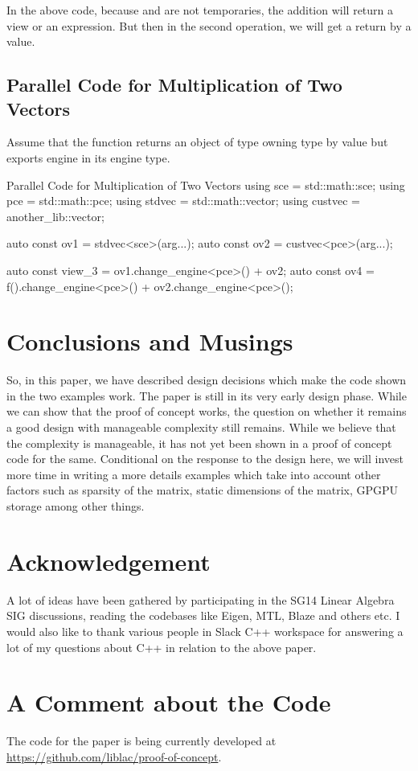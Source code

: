 \documentclass[oneside,11pt,a4paper]{jbarticle}
\begin{document}
In the above code, because  and  are not
temporaries, the addition will return a view or an expression. But then in the
second operation, we will get a return by a value.

\subsection{Parallel Code for Multiplication of Two Vectors}
Assume that the function  returns an object of type owning type
by value but exports engine  in its engine type.
\begin{codecpp}{Parallel Code for Multiplication of Two Vectors}
  using sce = std::math::sce;
  using pce = std::math::pce;
  using stdvec = std::math::vector;
  using custvec = another_lib::vector;

  auto const ov1 = stdvec<sce>(arg...);
  auto const ov2 = custvec<pce>(arg...);

  auto const view_3 = ov1.change_engine<pce>() + ov2;
  auto const ov4 = f().change_engine<pce>() + ov2.change_engine<pce>();
\end{codecpp}




\section{Conclusions and Musings}

So, in this paper, we have described design decisions which make the code shown
in the two examples work.  The paper is still in its very early design phase.
While we can show that the proof of concept works, the question on whether it
remains a good design with manageable complexity still remains. While we believe
that the complexity is manageable, it has not yet been shown in a proof of
concept code for the same. Conditional on the response to the design here, we
will invest more time in writing a more details examples which take into account
other factors such as sparsity of the matrix, static dimensions of the matrix,
GPGPU storage among other things.

\section{Acknowledgement}
A lot of ideas have been gathered by participating in the SG14 Linear Algebra
SIG discussions, reading the codebases like Eigen, MTL, Blaze and others etc. I
would also like to thank various people in Slack C++ workspace for answering a
lot of my questions about C++ in relation to the above paper.


\section{A Comment about the Code}
The code for the paper is being currently developed at
\url{https://github.com/liblac/proof-of-concept}.

\printbibliography
\end{document}
